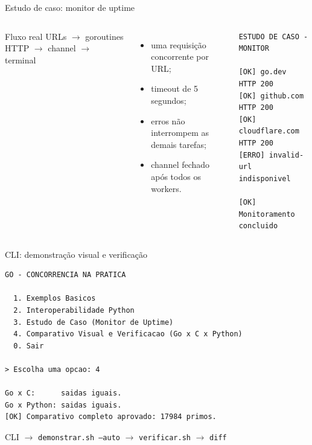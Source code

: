 \documentclass[aspectratio=169,11pt]{beamer}
\begin{document}
\begin{frame}[fragile]{Estudo de caso: monitor de uptime}
  \begin{columns}[T]
      \begin{block}{Fluxo real}
        \centering URLs $\rightarrow$ goroutines HTTP $\rightarrow$ channel $\rightarrow$ terminal
      \end{block}
      \begin{itemize}
        \item uma requisição concorrente por URL;
        \item timeout de 5 segundos;
        \item erros não interrompem as demais tarefas;
        \item channel fechado após todos os workers.
      \end{itemize}
\begin{lstlisting}[style=terminal]
ESTUDO DE CASO - MONITOR

[OK] go.dev          HTTP 200
[OK] github.com      HTTP 200
[OK] cloudflare.com  HTTP 200
[ERRO] invalid-url   indisponivel

[OK] Monitoramento concluido
\end{lstlisting}
  \end{columns}
\end{frame}

\begin{frame}[fragile]{CLI: demonstração visual e verificação}
\begin{lstlisting}[style=terminal]
GO - CONCORRENCIA NA PRATICA

  1. Exemplos Basicos
  2. Interoperabilidade Python
  3. Estudo de Caso (Monitor de Uptime)
  4. Comparativo Visual e Verificacao (Go x C x Python)
  0. Sair

> Escolha uma opcao: 4

Go x C:      saidas iguais.
Go x Python: saidas iguais.
[OK] Comparativo completo aprovado: 17984 primos.
\end{lstlisting}
  \begin{center}
    \small CLI $\rightarrow$ \texttt{demonstrar.sh --auto} $\rightarrow$ \texttt{verificar.sh} $\rightarrow$ \texttt{diff}
  \end{center}
\end{frame}
\end{document}

